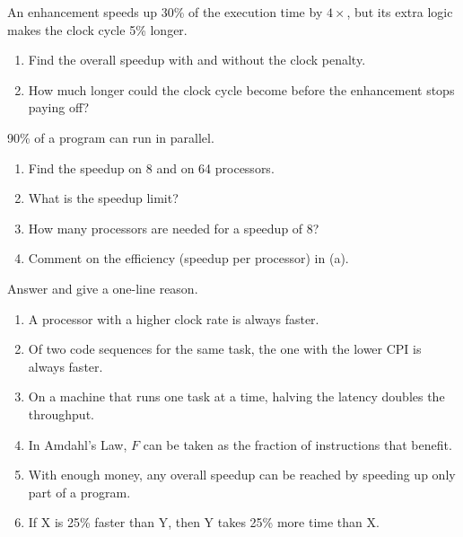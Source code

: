 \begin{exercise}\label{q:intro-clock}
An enhancement speeds up 30\% of the execution time by $4\times$, but its extra
logic makes the clock cycle 5\% longer.
\begin{enumerate}[label=(\alph*),leftmargin=*]
  \item Find the overall speedup with and without the clock penalty.
  \item How much longer could the clock cycle become before the enhancement
  stops paying off?
\end{enumerate}
\end{exercise}

\begin{exercise}\label{q:intro-par}
90\% of a program can run in parallel.
\begin{enumerate}[label=(\alph*),leftmargin=*]
  \item Find the speedup on 8 and on 64 processors.
  \item What is the speedup limit?
  \item How many processors are needed for a speedup of 8?
  \item Comment on the efficiency (speedup per processor) in (a).
\end{enumerate}
\end{exercise}

\begin{exercise}\label{q:intro-tf}
Answer and give a one-line reason.
\begin{enumerate}[label=(\alph*),leftmargin=*]
  \item A processor with a higher clock rate is always faster.
  \item Of two code sequences for the same task, the one with the lower CPI is
  always faster.
  \item On a machine that runs one task at a time, halving the latency doubles
  the throughput.
  \item In Amdahl's Law, $F$ can be taken as the fraction of instructions that
  benefit.
  \item With enough money, any overall speedup can be reached by speeding up
  only part of a program.
  \item If X is 25\% faster than Y, then Y takes 25\% more time than X.
\end{enumerate}
\end{exercise}

